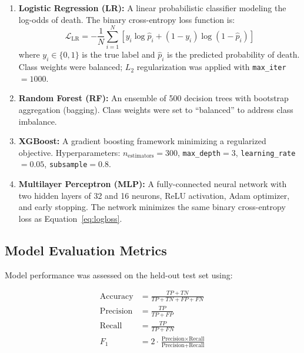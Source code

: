 \documentclass[12pt, a4paper]{article}
\begin{document}
\begin{enumerate}
    \item \textbf{Logistic Regression (LR):} A linear probabilistic 
    classifier modeling the log-odds of death. The binary cross-entropy 
    loss function is:
    \begin{equation}
        \mathcal{L}_\text{LR} = -\frac{1}{N}\sum_{i=1}^{N}
        \left[ y_i \log \hat{p}_i + (1-y_i)\log(1-\hat{p}_i) \right]
        \label{eq:logloss}
    \end{equation}
    where $y_i \in \{0,1\}$ is the true label and $\hat{p}_i$ is the 
    predicted probability of death. Class weights were balanced; 
    $L_2$ regularization was applied with \texttt{max\_iter}$=1000$.

    \item \textbf{Random Forest (RF):} An ensemble of 500 decision trees 
    with bootstrap aggregation (bagging). Class weights were set to 
    ``balanced'' to address class imbalance.

    \item \textbf{XGBoost:} A gradient boosting framework minimizing a 
    regularized objective. Hyperparameters: $n_\text{estimators}=300$, 
    \texttt{max\_depth}$=3$, \texttt{learning\_rate}$=0.05$, 
    \texttt{subsample}$=0.8$.

    \item \textbf{Multilayer Perceptron (MLP):} A fully-connected neural 
    network with two hidden layers of 32 and 16 neurons, ReLU activation, 
    Adam optimizer, and early stopping. The network minimizes the same 
    binary cross-entropy loss as Equation~\eqref{eq:logloss}.
\end{enumerate}

\subsection{Model Evaluation Metrics}

Model performance was assessed on the held-out test set using:

\begin{align}
    \text{Accuracy} &= \frac{TP + TN}{TP + TN + FP + FN} \label{eq:acc} \\[6pt]
    \text{Precision} &= \frac{TP}{TP + FP} \label{eq:prec} \\[6pt]
    \text{Recall} &= \frac{TP}{TP + FN} \label{eq:rec} \\[6pt]
    F_1 &= 2 \cdot \frac{\text{Precision} \times \text{Recall}}
                         {\text{Precision} + \text{Recall}} \label{eq:f1}
\end{align}
\end{document}
